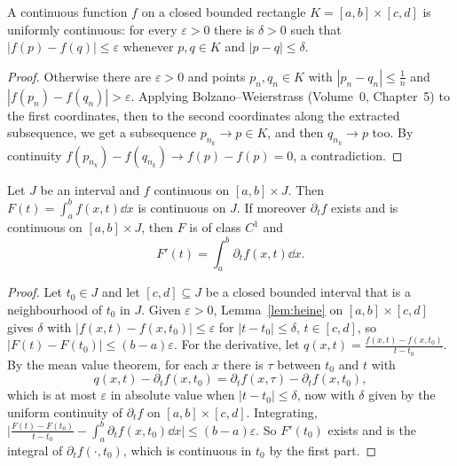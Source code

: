 \begin{lemma}[Heine]\label{lem:heine}
A continuous function $f$ on a closed bounded rectangle $K=[a,b]\times[c,d]$ is uniformly continuous: for every
$\varepsilon>0$ there is $\delta>0$ such that $|f(p)-f(q)|\le\varepsilon$ whenever $p,q\in K$ and $|p-q|\le\delta$.
\end{lemma}
\begin{proof}
Otherwise there are $\varepsilon>0$ and points $p_n,q_n\in K$ with $|p_n-q_n|\le\frac1n$ and $|f(p_n)-f(q_n)|>\varepsilon$. Applying
Bolzano--Weierstrass (Volume~0, Chapter~5) to the first coordinates, then to the second coordinates along the extracted
subsequence, we get a subsequence $p_{n_k}\to p\in K$, and then $q_{n_k}\to p$ too. By continuity
$f(p_{n_k})-f(q_{n_k})\to f(p)-f(p)=0$, a contradiction.
\end{proof}

\begin{theorem}\label{thm:paramcompact}
Let $J$ be an interval and $f$ continuous on $[a,b]\times J$. Then $F(t)=\int_a^bf(x,t)\dd x$ is continuous on $J$. If
moreover $\partial_tf$ exists and is continuous on $[a,b]\times J$, then $F$ is of class $C^1$ and
\[
F'(t)=\int_a^b\partial_tf(x,t)\dd x.
\]
\end{theorem}
\begin{proof}
Let $t_0\in J$ and let $[c,d]\subseteq J$ be a closed bounded interval that is a neighbourhood of $t_0$ in $J$. Given $\varepsilon>0$,
Lemma~\ref{lem:heine} on $[a,b]\times[c,d]$ gives $\delta$ with $|f(x,t)-f(x,t_0)|\le\varepsilon$ for $|t-t_0|\le\delta$, $t\in[c,d]$, so
$|F(t)-F(t_0)|\le(b-a)\varepsilon$. For the derivative, let $q(x,t)=\frac{f(x,t)-f(x,t_0)}{t-t_0}$. By the mean value theorem, for each $x$
there is $\tau$ between $t_0$ and $t$ with
\[
q(x,t)-\partial_tf(x,t_0)=\partial_tf(x,\tau)-\partial_tf(x,t_0),
\]
which is at most $\varepsilon$ in absolute value when $|t-t_0|\le\delta$, now with $\delta$ given by the uniform continuity of $\partial_tf$
on $[a,b]\times[c,d]$. Integrating, $\bigl|\frac{F(t)-F(t_0)}{t-t_0}-\int_a^b\partial_tf(x,t_0)\dd x\bigr|\le(b-a)\varepsilon$. So $F'(t_0)$ exists and is the
integral of $\partial_tf(\cdot,t_0)$, which is continuous in $t_0$ by the first part.
\end{proof}

